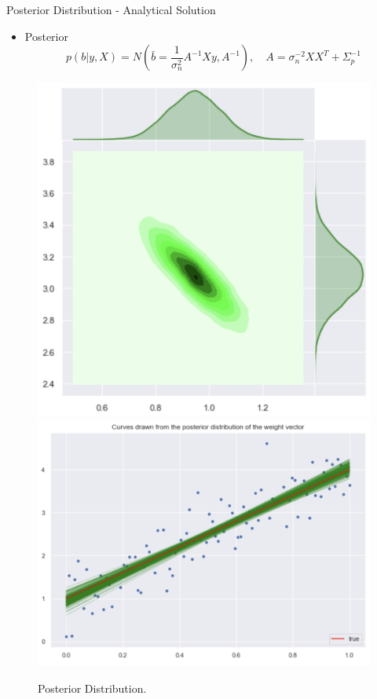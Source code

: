 \documentclass[10pt]{beamer}
\begin{document}
\begin{frame}{Posterior Distribution - Analytical Solution}{\cite[Chapter 2.1.1]{RW05}}
\begin{itemize}
\item Posterior 
$$
p(b|y, X) = N\left(\bar{b}=\frac{1}{\sigma_n^2}A^{-1}Xy, A^{-1}\right), \quad A=\sigma_{n}^{-2}XX^T + \Sigma_p^{-1}
$$
\end{itemize}
\begin{center}
\begin{figure}
\includegraphics[scale=0.17]{images/lin_join_posterior.png} 
\includegraphics[scale=0.17]{images/posterior_lin_mod_param_distr.png} 
\caption{Posterior Distribution.}
\end{figure}
\end{center}
\end{frame}
\end{document}

